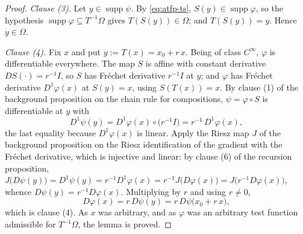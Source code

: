 \begin{proof}
\medskip\noindent\emph{Clause (3).}
Let $y\in\operatorname{supp}\psi$.  By \eqref{eq:atfp-ts}, $S(y)\in\operatorname{supp}\varphi$,
so the hypothesis $\operatorname{supp}\varphi\subseteq T^{-1}\Omega$ gives $T(S(y))\in\Omega$;
and $T(S(y))=y$.  Hence $y\in\Omega$.

\medskip\noindent\emph{Clause (4).}
Fix $x$ and put $y:=T(x)=x_0+r\,x$.  Being of class $C^{\infty}$, $\varphi$ is differentiable
everywhere.  The map $S$ is affine with constant derivative $DS(\cdot)=r^{-1}I$, so
$S$ has Fréchet derivative $r^{-1}I$ at $y$; and $\varphi$ has Fréchet derivative
$D^{1}\varphi(x)$ at $S(y)=x$, using $S(T(x))=x$.  By clause (1) of the background proposition on
the chain rule for compositions, $\psi=\varphi\circ S$ is differentiable at $y$ with
\[
  D^{1}\psi(y)=D^{1}\varphi(x)\circ\bigl(r^{-1}I\bigr)=r^{-1}\,D^{1}\varphi(x),
\]
the last equality because $D^{1}\varphi(x)$ is linear.  Apply the Riesz map $J$ of the background
proposition on the Riesz identification of the gradient with the Fréchet derivative, which is
injective and linear: by clause (6) of the recursion proposition,
$J\bigl(D\psi(y)\bigr)=D^{1}\psi(y)=r^{-1}D^{1}\varphi(x)=r^{-1}J\bigl(D\varphi(x)\bigr)
 =J\bigl(r^{-1}D\varphi(x)\bigr)$, whence $D\psi(y)=r^{-1}D\varphi(x)$.  Multiplying by $r$ and
using $r\ne0$,
\[
  D\varphi(x)=r\,D\psi(y)=r\,D\psi\bigl(x_0+r\,x\bigr),
\]
which is clause (4).  As $x$ was arbitrary, and as $\varphi$ was an arbitrary test function
admissible for $T^{-1}\Omega$, the lemma is proved.
\end{proof}
